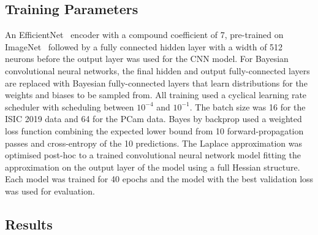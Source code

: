 \subsection{Training Parameters}
An EfficientNet~\citep{tan2019efficientnet} encoder with a compound coefficient of 7, pre-trained on ImageNet~\citep{deng2009imagenet} followed by a fully connected hidden layer with a width of 512 neurons before the output layer was used for the CNN model. For Bayesian convolutional neural networks, the final hidden and output fully-connected layers are replaced with Bayesian fully-connected layers that learn distributions for the weights and biases to be sampled from. All training used a cyclical learning rate scheduler with scheduling between $10^{-4}$ and $10^{-1}$. The batch size was 16 for the ISIC 2019 data and 64 for the PCam data. Bayes by backprop used a weighted loss function combining the expected lower bound from 10 forward-propagation passes and cross-entropy of the 10 predictions. The Laplace approximation was optimised post-hoc to a trained convolutional neural network model fitting the approximation on the output layer of the model using a full Hessian structure. Each model was trained for 40 epochs and the model with the best validation loss was used for evaluation.


\subsection{Results}
\label{subsec:calibration_results}

